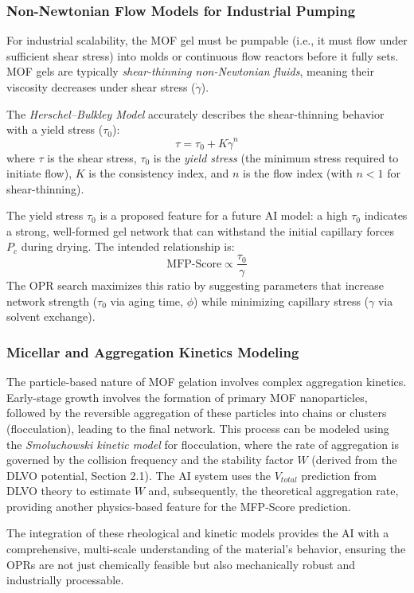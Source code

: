 \documentclass[12pt,a4paper]{article}
\begin{document}
\subsubsection{Non-Newtonian Flow Models for Industrial Pumping}

For industrial scalability, the MOF gel must be pumpable (i.e., it must flow under sufficient shear stress) into molds or continuous flow reactors before it fully sets. MOF gels are typically \textit{shear-thinning non-Newtonian fluids}, meaning their viscosity decreases under shear stress ($\dot{\gamma}$).

The \textit{Herschel–Bulkley Model} accurately describes the shear-thinning behavior with a yield stress ($\tau_0$):
\[
\tau = \tau_0 + K \dot{\gamma}^n
\]
where $\tau$ is the shear stress, $\tau_0$ is the \textit{yield stress} (the minimum stress required to initiate flow), $K$ is the consistency index, and $n$ is the flow index (with $n<1$ for shear-thinning).

The yield stress $\tau_0$ is a proposed feature for a future AI model: a high $\tau_0$ indicates a strong, well-formed gel network that can withstand the initial capillary forces $P_c$ during drying. The intended relationship is:
\[
\text{MFP-Score} \propto \frac{\tau_0}{\gamma}
\]
The OPR search maximizes this ratio by suggesting parameters that increase network strength ($\tau_0$ via aging time, $\phi$) while minimizing capillary stress ($\gamma$ via solvent exchange).

\subsubsection{Micellar and Aggregation Kinetics Modeling}

The particle-based nature of MOF gelation involves complex aggregation kinetics. Early-stage growth involves the formation of primary MOF nanoparticles, followed by the reversible aggregation of these particles into chains or clusters (flocculation), leading to the final network. This process can be modeled using the \textit{Smoluchowski kinetic model} for flocculation, where the rate of aggregation is governed by the collision frequency and the stability factor $W$ (derived from the DLVO potential, Section 2.1). The AI system uses the $V_{total}$ prediction from DLVO theory to estimate $W$ and, subsequently, the theoretical aggregation rate, providing another physics-based feature for the MFP-Score prediction.

The integration of these rheological and kinetic models provides the AI with a comprehensive, multi-scale understanding of the material's behavior, ensuring the OPRs are not just chemically feasible but also mechanically robust and industrially processable.
\end{document}
